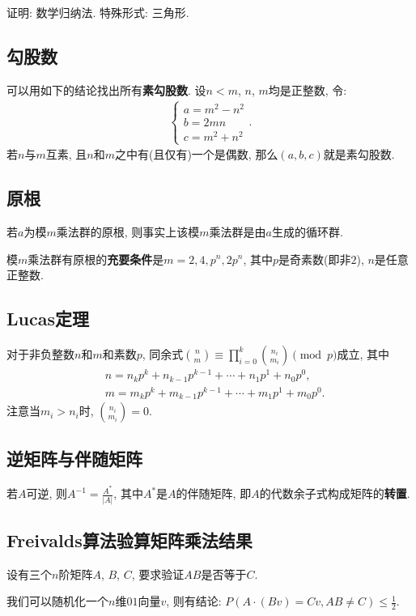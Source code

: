 证明: 数学归纳法. 特殊形式: 三角形.


\subsection{勾股数}
可以用如下的结论找出所有\textbf{素勾股数}.
设$n < m$, $n$, $m$均是正整数, 令:
\begin{gather*}
    \left\{ \begin{array}{l}
        a = m^2 - n^2 \\
        b = 2mn \\
        c = m^2 + n^2
    \end{array} \right. .
\end{gather*}
若$n$与$m$互素, 且$n$和$m$之中有(且仅有)一个是偶数, 那么$(a,b,c)$就是素勾股数.


\subsection{原根}
若$a$为模$m$乘法群的原根, 则事实上该模$m$乘法群是由$a$生成的循环群.

模$m$乘法群有原根的\textbf{充要条件}是$m = 2, 4, p^n , 2p^n$, 其中$p$是奇素数(即非$2$), $n$是任意正整数.


\subsection{Lucas定理}
对于非负整数$n$和$m$和素数$p$, 同余式$\binom{n}{m} \equiv \prod_{i=0}^k \binom{n_i}{m_i} \pmod{p}$成立, 其中
\begin{align*}
    & n = n_k p^k + n_{k-1} p^{k-1} + \cdots + n_1 p^1 + n_0 p^0, \\
    & m = m_k p^k + m_{k-1} p^{k-1} + \cdots + m_1 p^1 + m_0 p^0.
\end{align*}
注意当$m_i > n_i$时, $\binom{n_i}{m_i} = 0$.


\subsection{逆矩阵与伴随矩阵}
若$A$可逆, 则$A^{-1} = \frac{A^*}{|A|}$, 其中$A^*$是$A$的伴随矩阵, 即$A$的代数余子式构成矩阵的\textbf{转置}.


\subsection{Freivalds算法验算矩阵乘法结果}
设有三个$n$阶矩阵$A$, $B$, $C$, 要求验证$AB$是否等于$C$.

我们可以随机化一个$n$维$01$向量$v$, 则有结论: $P(A \cdot (Bv) = Cv, AB \ne C) \leq \frac{1}{2}$.

